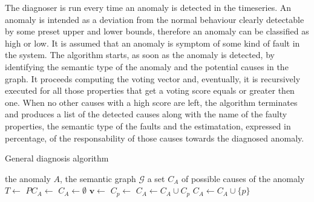 The diagnoser is run every time an anomaly is detected in the timeseries. An anomaly is intended as a deviation from the normal behaviour clearly detectable by some preset upper and lower bounds, therefore an anomaly can be classified as high or low.
It is assumed that an anomaly is symptom of some kind of fault in the system. The algorithm starts, as soon as the anomaly is detected, by identifying the semantic type of the anomaly and the potential causes in the graph. It proceeds computing the voting vector and, eventually, it is recursively executed for all those properties that get a voting score equals or greater then one. When no other causes with a high score are left, the algorithm terminates and produces a list of the detected causes along with the name of the faulty properties, the semantic type of the faults and the estimatation, expressed in percentage, of the responsability of those causes towards the diagnosed anomaly.
\begin{algorithm}
  \caption{General diagnosis algorithm}\label{diagnosis}
  \begin{algorithmic}[1]
    \Require
      \Statex the anomaly $A$,
      \Statex the semantic graph $\mathcal{G}$
    \Ensure a set $C_A$ of possible causes of the anomaly
    \State $T\leftarrow$ 
    \State $PC_A\leftarrow$ 
    \State $C_A\leftarrow\emptyset$
    \State $\bm v\leftarrow$ 
    \State $C_p\leftarrow$  
    \State $C_A\leftarrow C_A\cup C_p$
    \Else
    \State $C_A\leftarrow C_A\cup\{p\}$ 
    \EndIf
    \EndIf
    \EndFor
    \EndProcedure
  \end{algorithmic}
\end{algorithm}
